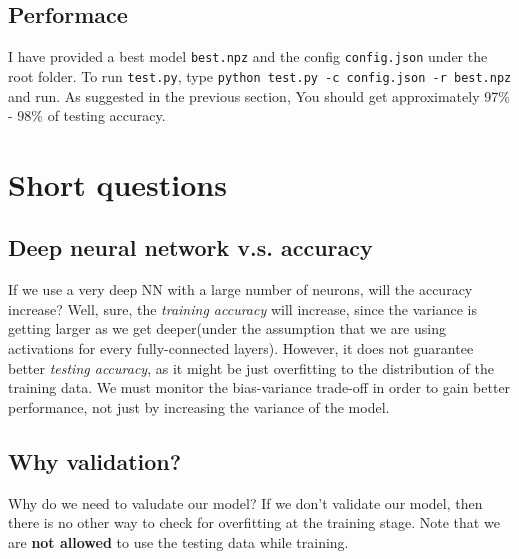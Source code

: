 \documentclass{article}
\begin{document}
    \subsection{Performace}
        I have provided a best model \verb|best.npz| and the config 
        \verb|config.json| under the root folder.  To run \verb|test.py|, type 
        \verb|python test.py -c config.json -r best.npz| and run. As suggested 
        in the previous section, You should get approximately 97\% - 98\% of 
        testing accuracy.

\section{Short questions}

    \subsection{Deep neural network v.s. accuracy}
        If we use a very deep NN with a large number of neurons, will the accuracy
        increase? Well, sure, the \emph{training accuracy} will increase, since the 
        variance is getting larger as we get deeper(under the assumption that
        we are using activations for every fully-connected layers). However,
        it does not guarantee better \emph{testing accuracy}, as it might be 
        just overfitting to the distribution of the training data. We must 
        monitor the bias-variance trade-off in order to gain better performance, 
        not just by increasing the variance of the model.

    \subsection{Why validation?}
        Why do we need to valudate our model? If we don't validate our model, 
        then there is no other way to check for overfitting at the training stage.
        Note that we are \textbf{not allowed} to use the testing data
        while training. 
\end{document}
